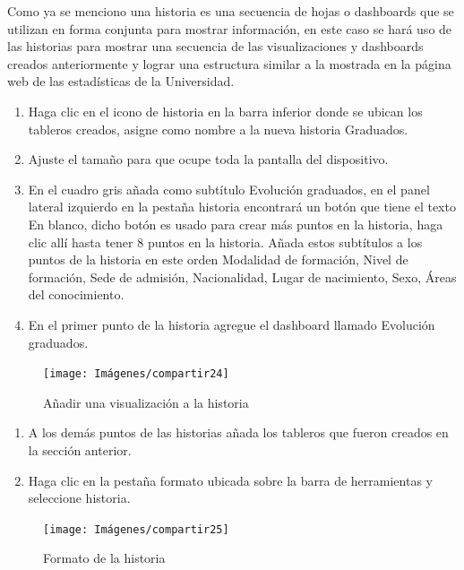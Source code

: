 \documentclass[
]{book}
\begin{document}
Como ya se menciono una historia es una secuencia de hojas o dashboards que se utilizan en forma conjunta para mostrar información, en este caso se hará uso de las historias para mostrar una secuencia de las visualizaciones y dashboards creados anteriormente y lograr una estructura similar a la mostrada en la página web de las estadísticas de la Universidad.

\begin{enumerate}
\def\labelenumi{\arabic{enumi}.}
\item
  Haga clic en el icono de historia en la barra inferior donde se ubican los tableros creados, asigne como nombre a la nueva historia Graduados.
\item
  Ajuste el tamaño para que ocupe toda la pantalla del dispositivo.
\item
  En el cuadro gris añada como subtítulo Evolución graduados, en el panel lateral izquierdo en la pestaña historia encontrará un botón que tiene el texto En blanco, dicho botón es usado para crear más puntos en la historia, haga clic allí hasta tener \(8\) puntos en la historia. Añada estos subtítulos a los puntos de la historia en este orden Modalidad de formación, Nivel de formación, Sede de admisión, Nacionalidad, Lugar de nacimiento, Sexo, Áreas del conocimiento.
\item
  En el primer punto de la historia agregue el dashboard llamado Evolución graduados.
\end{enumerate}

\begin{figure}

{\centering \texttt{[image: Imágenes/compartir24]} 

}

\caption{Añadir una visualización a la historia}\label{fig:paso4compartir-fig}
\end{figure}

\begin{enumerate}
\def\labelenumi{\arabic{enumi}.}
\setcounter{enumi}{4}
\item
  A los demás puntos de las historias añada los tableros que fueron creados en la sección anterior.
\item
  Haga clic en la pestaña formato ubicada sobre la barra de herramientas y seleccione historia.
\end{enumerate}

\begin{figure}

{\centering \texttt{[image: Imágenes/compartir25]} 

}

\caption{Formato de la historia}\label{fig:paso6compartir-fig}
\end{figure}
\end{document}
